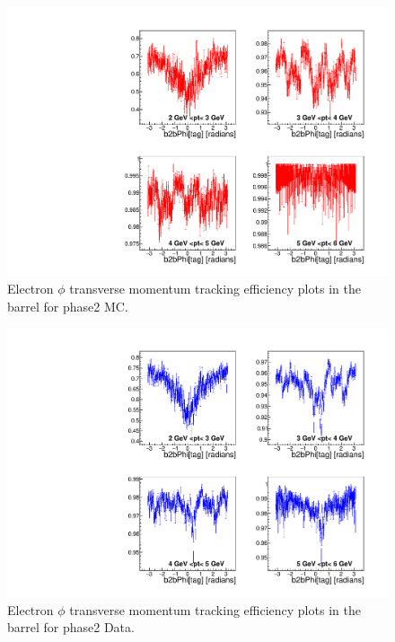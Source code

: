 \documentclass[a4paper,11pt,twosided,final,german,openbib,pdftex,listof=totoc,bibliography=totoc]{scrbook}
\begin{document}
\begin{appendix}
\begin{figure}[!htbp]
	\centering
	\includegraphics[width=\textwidth]{Plots/master/xPtMPhiemBarrel_MC}
	\caption[Transverse Momentum $\phi$ Electron Barrel Efficiency Phase2 MC]{Electron $\phi$ transverse momentum tracking efficiency plots in the barrel for phase2 MC.}
	\label{plt:PtMPhiemBarrel_MC}
\end{figure}


\begin{figure}[!htbp]
	\centering
	\includegraphics[width=\textwidth]{Plots/master/xPtMPhiemBarrel_Data}
	\caption[Transverse Momentum $\phi$ Electron Barrel Efficiency Phase2 Data]{Electron $\phi$ transverse momentum tracking efficiency plots in the barrel for phase2 Data.}
	\label{plt:PtMPhiemBarrel_Data}
\end{figure}



\end{appendix}
\end{document}
